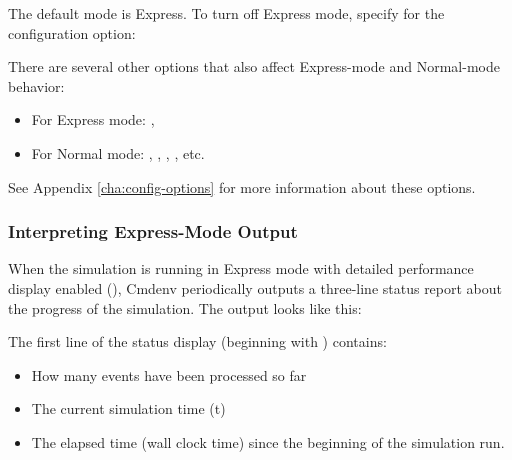 The default mode is Express. To turn off Express mode, specify  for
the  configuration option:


There are several other options that also affect Express-mode and Normal-mode
behavior:

\begin{itemize}
  \item For Express mode: , 
  \item For Normal mode: , ,
        , , etc.
\end{itemize}

See Appendix \ref{cha:config-options} for more information about these options.

\subsubsection{Interpreting Express-Mode Output}
\label{sec:run-sim:cmdenv:express-mode:output}

When the simulation is running in Express mode with detailed
performance display enabled (), Cmdenv
periodically outputs a three-line status report about the progress of the simulation.
The output looks like this:


The first line of the status display (beginning with \ttt{**})
contains:

\begin{itemize}
   \item How many events have been processed so far
   \item The current simulation time (t)
   \item The elapsed time (wall clock time) since the beginning of the simulation run.
\end{itemize}

